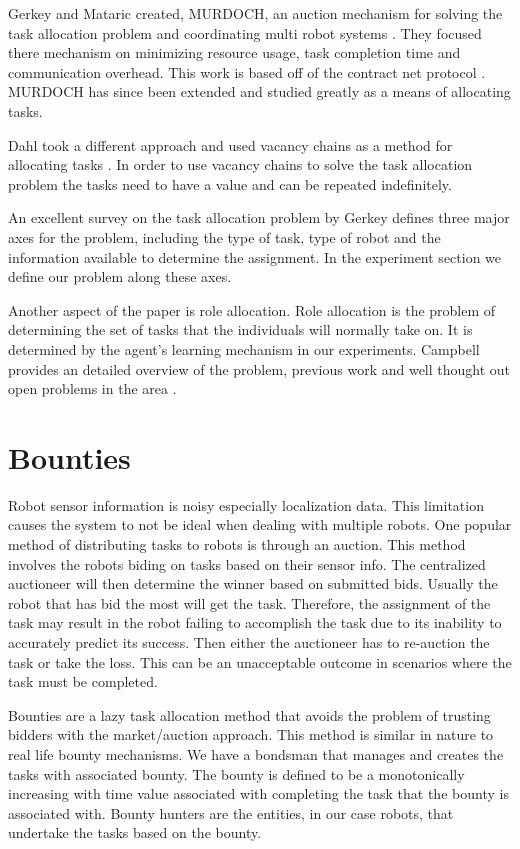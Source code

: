 \documentclass[twocolumn]{article}
\begin{document}
Gerkey and Mataric created, MURDOCH, an auction mechanism for solving the task allocation problem and coordinating multi robot systems \cite{Gerkey2002c}.  They focused there mechanism on minimizing resource usage, task completion time and communication overhead.  This work is based off of the contract net protocol \cite{Davis1983}.  MURDOCH has since been extended and studied greatly as a means of allocating tasks.

Dahl took a different approach and used vacancy chains as a method for allocating tasks \cite{Dahl2003}.  In order to use vacancy chains to solve the task allocation problem the tasks need to have a value and can be repeated indefinitely.  

An excellent survey on the task allocation problem by Gerkey \cite{Gerkey2004} defines three major axes for the problem, including the type of task, type of robot and the information available to determine the assignment.  In the experiment section we define our problem along these axes.  

Another aspect of the paper is role allocation.  Role allocation is the problem of determining the set of tasks that the individuals will normally take on.  It is determined by the agent's learning mechanism in our experiments. Campbell provides an detailed overview of the problem, previous  work and well thought out open problems in the area \cite{Campbell2010}.

\section{Bounties}
Robot sensor information is noisy especially localization data.  This limitation causes the system to not be ideal when dealing with multiple robots.  One popular method of distributing tasks to robots is through an auction.  This method involves the robots biding on tasks based on their sensor info.  The centralized auctioneer will then determine the winner based on submitted bids.  Usually the robot that has bid the most will get the task.  Therefore, the assignment of the task may result in the robot failing to accomplish the task due to its inability to accurately predict its success.  Then either the auctioneer has to re-auction the task or take the loss.  This can be an unacceptable outcome in scenarios where the task must be completed.

Bounties are a lazy task allocation method that avoids the problem of trusting bidders with the market/auction approach.  This method is similar in nature to real life bounty mechanisms.  We have a bondsman that manages and creates the tasks with associated bounty.  The bounty is defined to be a monotonically increasing with time value associated with completing the task that the bounty is associated with.  Bounty hunters are the entities, in our case robots, that undertake the tasks based on the bounty.
\end{document}
